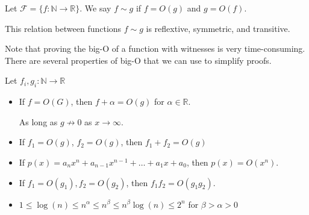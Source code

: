 \begin{notation}
	Let \( \mathcal{F} = \{f \colon \mathbb{N}\to \mathbb{R}\}   \). We say \( f \sim g \) if \( f = O(g) \) and \( g = O(f) \).
	\begin{note}
		This relation between functions \( f\sim g \) is reflextive, symmetric, and transitive.
	\end{note}
\end{notation}

Note that proving the big-O of a function with witnesses is very time-consuming. There are several properties of big-O that we can use to simplify proofs. 
\begin{property}
	Let \( f_i,g_i \colon \mathbb{N} \to  \mathbb{R}\)
	\begin{itemize}
		\item If \( f = O(G) \), then \( f + \alpha = O(g) \) for \( \alpha \in \mathbb{R} \).
			\begin{note}
				As long as \( g \not\to 0 \) as \( x \to \infty \).
			\end{note}
		\item If \( f_{1}=O(g)\), \( f_{2} = O(g) \), then \( f_{1} + f_{2} = O(g) \)
		\item If \(	p(x) = a_n x^n + a_{n-1}x^{n-1} + \ldots + a_1 x + a_0 \), then \( p(x) = O(x^n) \).
		\item If \( f_{1}=O(g_{1}), f_{2}=O(g_{2}) \), then \( f_{1}f_{2} = O(g_{1}g_{2}) \).
		\item \( 1 \le  \log (n) \le  n^{\alpha} \le n^{\beta} \le n^{\beta}\log (n) \le 2^n \) for \( \beta > \alpha > 0 \)
	\end{itemize}
\end{property}

